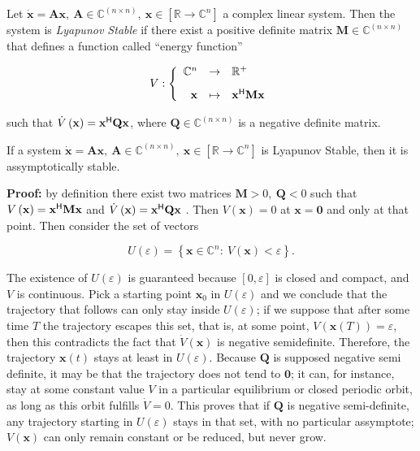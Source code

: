 \begin{definition}\label{def:lyapunov_linear} %
	Let $\dot{\mathbf{x}} = \mathbf{Ax},\ \mathbf{A}\in\mathbb{C}^{(n\times n)},\ \mathbf{x}\in\left[\mathbb{R}\to\mathbb{C}^n\right]$ a complex linear system. Then the system is \textit{Lyapunov Stable} if there exist a positive definite matrix $\mathbf{M}\in\mathbb{C}^{(n\times n)}$ that defines a function called ``energy function''

\begin{equation} V:\left\{\begin{array}{rcl} \mathbb{C}^n &\to& \mathbb{R}^+ \\[3mm] \mathbf{x} &\mapsto& \mathbf{x}^{\mathsf{H}}\mathbf{Mx} \end{array}\right.\end{equation}

	\noindent such that $\dot{V}\left(\mathbf{x}\right) = \mathbf{x}^{\mathsf{H}}\mathbf{Qx}$, where $\mathbf{Q}\in\mathbb{C}^{(n\times n)}$ is a negative definite matrix.
\end{definition}%
\begin{theorem}\label{theo:lyapunov_linear} %
	If a system $\dot{\mathbf{x}} = \mathbf{Ax},\ \mathbf{A}\in\mathbb{C}^{(n\times n)},\ \mathbf{x}\in\left[\mathbb{R}\to\mathbb{C}^n\right]$ is Lyapunov Stable, then it is assymptotically stable.
\end{theorem}
\noindent\textbf{Proof:} by definition there exist two matrices $\mathbf{M} > 0,\ \mathbf{Q} < 0$ such that $V\left(\mathbf{x}\right) = \mathbf{x}^{\mathsf{H}}\mathbf{Mx}$ and $\dot{V}\left(\mathbf{x}\right) = \mathbf{x}^{\mathsf{H}}\mathbf{Qx}$ . Then $V\left(\mathbf{x}\right) = 0$ at $\mathbf{x = 0}$ and only at that point. Then consider the set of vectors

\begin{equation} U\left(\varepsilon\right) = \left\{\mathbf{x}\in\mathbb{C}^n:\ V\left(\mathbf{x}\right) < \varepsilon\right\} .\end{equation}

	The existence of $U\left(\varepsilon\right)$ is guaranteed because $\left[0,\varepsilon\right]$ is closed and compact, and $V$ is continuous. Pick a starting point $\mathbf{x}_0$ in $U\left(\varepsilon\right)$ and we conclude that the trajectory that follows can only stay inside $U\left(\varepsilon\right)$; if we suppose that after some time $T$ the trajectory escapes this set, that is, at some point, $V\left(\mathbf{x}\left(T\right)\right) = \varepsilon$, then this contradicts the fact that $\dot{V}\left(\mathbf{x}\right)$ is negative semidefinite. Therefore, the trajectory $\mathbf{x}(t)$ stays at least in $U\left(\varepsilon\right)$. Because $\mathbf{Q}$ is supposed negative semi definite, it may be that the trajectory does not tend to $\mathbf{0}$; it can, for instance, stay at some constant value $V$ in a particular equilibrium or closed periodic orbit, as long as this orbit fulfills $\dot{V} = 0$. This proves that if $\mathbf{Q}$ is negative semi-definite, any trajectory starting in $U\left(\varepsilon\right)$ stays in that set, with no particular assymptote; $V\left(\mathbf{x}\right)$ can only remain constant or be reduced, but never grow.

